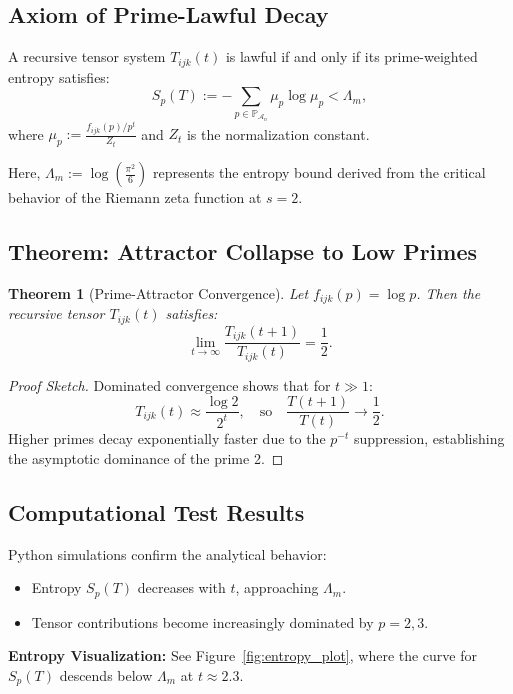 \documentclass[12]{amsart}
\theoremstyle{plain}
\newtheorem{theorem}{Theorem}[section]
\begin{document}
\subsection{Axiom of Prime-Lawful Decay}

\begin{axiom}
A recursive tensor system $T_{ijk}(t)$ is lawful if and only if its prime-weighted entropy satisfies:
\begin{equation}
    S_p(T) := -\sum_{p \in \mathbb{P}_{\mathcal{A}_n}} \mu_p \log \mu_p < \Lambda_m,
\end{equation}
where $\mu_p := \frac{f_{ijk}(p) / p^t}{Z_t}$ and $Z_t$ is the normalization constant.
\end{axiom}
Here, $\Lambda_m := \log\left(\frac{\pi^2}{6}\right)$ represents the entropy bound derived from the critical behavior of the Riemann zeta function at $s=2$.

\subsection{Theorem: Attractor Collapse to Low Primes}

\begin{theorem}[Prime-Attractor Convergence]
Let $f_{ijk}(p) = \log p$. Then the recursive tensor $T_{ijk}(t)$ satisfies:
\begin{equation}
    \lim_{t \to \infty} \frac{T_{ijk}(t+1)}{T_{ijk}(t)} = \frac{1}{2}.
\end{equation}
\end{theorem}
\begin{proof}[Proof Sketch]
Dominated convergence shows that for $t \gg 1$:
\[
T_{ijk}(t) \approx \frac{\log 2}{2^t}, \quad \text{so} \quad \frac{T(t+1)}{T(t)} \to \frac{1}{2}.
\]
Higher primes decay exponentially faster due to the $p^{-t}$ suppression, establishing the asymptotic dominance of the prime 2.
\end{proof}

\subsection{Computational Test Results}

Python simulations confirm the analytical behavior:
\begin{itemize}
    \item Entropy $S_p(T)$ decreases with $t$, approaching $\Lambda_m$.
    \item Tensor contributions become increasingly dominated by $p = 2,3$.
\end{itemize}
\textbf{Entropy Visualization:} See Figure~\ref{fig:entropy_plot}, where the curve for $S_p(T)$ descends below $\Lambda_m$ at $t \approx 2.3$.
\end{document}
